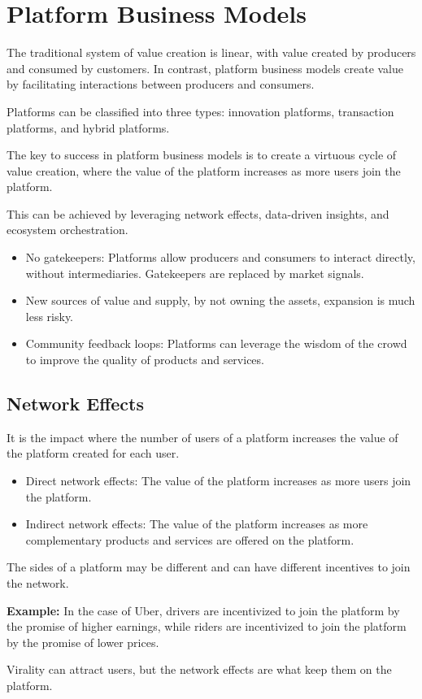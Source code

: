 \section{Platform Business Models}
The traditional system of value creation is linear, with value created 
by producers and consumed by customers. In contrast, platform business models 
create value by facilitating interactions between producers and consumers. 

Platforms can be classified into three types: innovation platforms, transaction platforms, and hybrid platforms. 

The key to success in platform business models is to create a virtuous 
cycle of value creation,
where the value of the platform increases as more users join the platform. 

This can be achieved by leveraging network effects, data-driven insights, and ecosystem orchestration.

\begin{itemize}
	\item No gatekeepers: Platforms allow producers and consumers to interact directly, without intermediaries. Gatekeepers are replaced by market signals.
	\item New sources of value and supply, by not owning the assets, expansion is much less risky.
	\item Community feedback loops: Platforms can leverage the wisdom of the crowd to improve the quality of products and services.
\end{itemize}

\subsection{Network Effects}
It is the impact where the number of users of a platform increases the value of the platform created for each user.

\begin{itemize}
	\item Direct network effects: The value of the platform increases as more users join the platform.
	\item Indirect network effects: The value of the platform increases as more complementary products and services are offered on the platform.
\end{itemize}

The sides of a platform may be different and can have different incentives to join the network.

\begin{callout}
	\textbf{Example:} In the case of Uber, drivers are incentivized to join the platform by the promise of higher earnings, while riders are incentivized to join the platform by the promise of lower prices.

	Virality can attract users, but the network effects are what keep them on the platform.
\end{callout}


